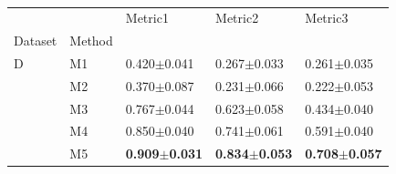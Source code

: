 \setlength{\parindent}{0pt}
\setlength{\intextsep}{0pt}  %
\begin{minipage}{\linewidth}
    \vspace{10pt}
\begin{table}[H]
    \centering
    \begin{tabular}{lllll}
    \toprule
       &           &                                       Metric1 &                                 Metric2 &                                      Metric3 \\
    Dataset & Method &                                          &                                          &                                          \\
    \midrule
    D & M1 &           0.420\footnotesize{$\pm$0.041} &           0.267\footnotesize{$\pm$0.033} &           0.261\footnotesize{$\pm$0.035} \\
       & M2 &           0.370\footnotesize{$\pm$0.087} &           0.231\footnotesize{$\pm$0.066} &           0.222\footnotesize{$\pm$0.053} \\
       & M3 &           0.767\footnotesize{$\pm$0.044} &           0.623\footnotesize{$\pm$0.058} &           0.434\footnotesize{$\pm$0.040} \\
       & M4 &           0.850\footnotesize{$\pm$0.040} &           0.741\footnotesize{$\pm$0.061} &           0.591\footnotesize{$\pm$0.040} \\
       & M5 &           \textbf{0.909\footnotesize{$\pm$0.031}} &           \textbf{0.834\footnotesize{$\pm$0.053}} &           \textbf{0.708\footnotesize{$\pm$0.057}} \\
    \bottomrule
    \end{tabular}
    \setlength{\abovecaptionskip}{0pt}
    \centering
    \vspace{3pt}
    \\
    \justifying
    \myriadpro\fontsize{8pt}{9.6pt}\selectfont

    \caption{}\label{table:dummy}
\end{table}
\end{minipage}
\vspace{0pt}
\setlength{\intextsep}{12pt}
\setlength{\abovecaptionskip}{2pt}